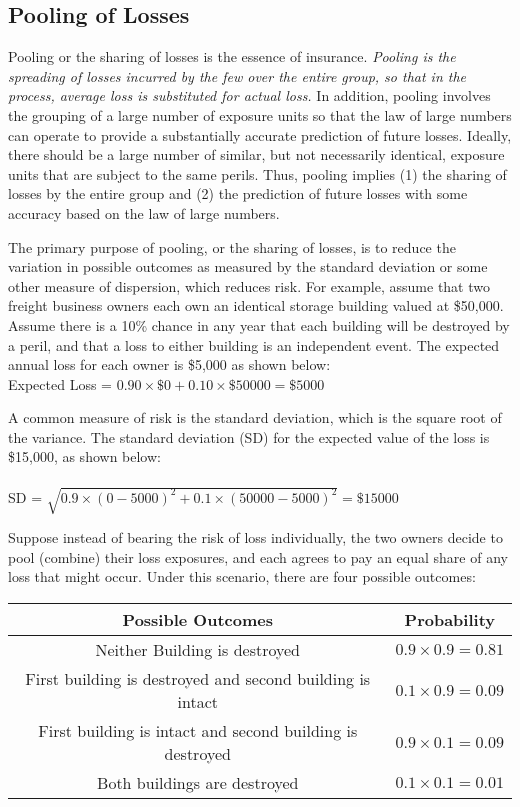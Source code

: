 \subsection{Pooling of Losses}
Pooling or the sharing of losses is the essence of insurance. \textit{Pooling is the spreading of losses incurred by the few over the entire group, so that in the process, average loss is substituted for actual loss.} In addition, pooling involves the grouping of a large number of exposure units so that the law of large numbers can operate to provide a substantially accurate prediction of future losses. Ideally, there should be a large number of similar, but not necessarily identical, exposure units that are subject to the same perils. Thus, pooling implies (1) the sharing of losses by the entire group and (2) the prediction of future losses with some accuracy based on the law of large numbers.\\
\par
The primary purpose of pooling, or the sharing of losses, is to reduce the variation in possible outcomes as measured by the standard deviation or some other measure of dispersion, which reduces risk. For example, assume that two freight business owners each own an identical storage building valued at \$50,000. Assume there is a 10\% chance in any year that each building will be destroyed by a peril, and that a loss to either building is an independent event. The expected annual loss for each owner is \$5,000 as shown below:\\
Expected Loss = $ 0.90 \times \$0 + 0.10 \times \$50000 = \$5000 $\\
\par
A common measure of risk is the standard deviation, which is the square root of the variance. The standard deviation (SD) for the expected value of the loss is \$15,000, as shown below:\\\\
SD = $\sqrt{ 0.9 \times (0 - 5000)^2 + 0.1 \times (50000 - 5000)^2} = \$15000$\\
\par
Suppose instead of bearing the risk of loss individually, the two owners decide to pool (combine) their loss exposures, and each agrees to pay an equal share of any loss that might occur. Under this scenario, there are four possible outcomes:
\begin{center}
	\begin{tabular}{c c}
		Possible Outcomes & Probability\\
		\hline
		Neither Building is destroyed & $0.9 \times 0.9 = 0.81$\\
		First building is destroyed and second building is intact & $0.1 \times 0.9 = 0.09$\\
		First building is intact and second building is destroyed & $0.9 \times 0.1 = 0.09$\\
		Both buildings are destroyed & $ 0.1 \times 0.1 = 0.01$
	\end{tabular}
\end{center}
